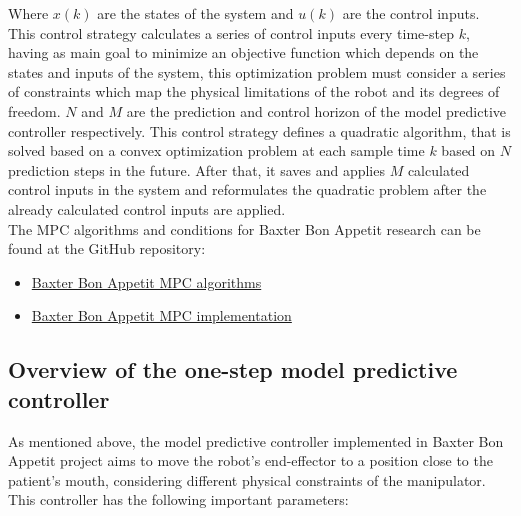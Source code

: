 \documentclass[11pt]{report} %
\begin{document}
Where $x(k)$ are the states of the system and $u(k)$ are the control inputs.\\

This control strategy calculates a series of control inputs every time-step $k$, having as main goal to minimize an objective function which depends on the states and inputs of the system, this optimization problem must consider a series of constraints which map the physical limitations of the robot and its degrees of freedom. $N$ and $M$ are the prediction and control horizon of the model predictive controller respectively. This control strategy defines a quadratic algorithm, that is solved based on a convex optimization problem at each sample time $k$ based on $N$ prediction steps in the future. After that, it saves and applies $M$ calculated control inputs in the system and reformulates the quadratic problem after the already calculated control inputs are applied.\\

The MPC algorithms and conditions for Baxter Bon Appetit research can be found at the GitHub repository:

\begin{itemize}
    \color{blue}
    \item \href{https://github.com/san99tiago/baxter-bon-appetit/tree/main/python/baxter_bon_appetit/src/baxter_control}{Baxter Bon Appetit MPC algorithms}
    
    \color{blue}
    \item \href{https://github.com/san99tiago/baxter-bon-appetit/blob/main/python/baxter_bon_appetit/scripts/node_mpc_control_trajectory.py}{Baxter Bon Appetit MPC implementation}
\end{itemize}


\subsection{Overview of the one-step model predictive controller}

As mentioned above, the model predictive controller implemented in Baxter Bon Appetit project aims to move the robot's end-effector to a position close to the patient's mouth, considering different physical constraints of the manipulator.\\

This controller has the following important parameters:
\end{document}
